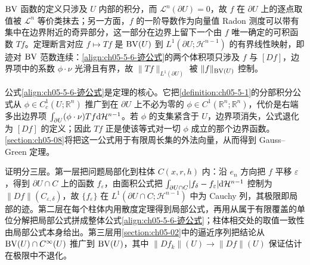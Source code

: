 \documentclass[../../main.tex]{subfiles}%
\begin{document}
\begin{remark}\label{remark:ch05-thm-5-6-动机}
$\mathrm{BV}$ 函数的定义只涉及 $U$ 内部的积分，而 $\mathcal{L}^n(\partial U)=0$，故 $f$ 在 $\partial U$ 上的逐点取值被 $\mathcal{L}^n$ 等价类抹去；另一方面，$f$ 的一阶导数作为向量值 Radon 测度可以带有集中在边界附近的奇异部分，这一部分在边界上留下一个由 $f$ 唯一确定的可积函数 $Tf$。定理断言对应 $f\mapsto Tf$ 是 $\mathrm{BV}(U)$ 到 $L^1(\partial U;\mathcal{H}^{n-1})$ 的有界线性映射，即迹对 $\mathrm{BV}$ 范数连续：\eqref{align:ch05-5-6-迹公式}的两个体积项只涉及 $f$ 与 $[Df]$，边界项中的系数 $\phi\cdot\nu$ 光滑且有界，故 $\lVert Tf\rVert_{L^1(\partial U)}$ 被 $\lVert f\rVert_{\mathrm{BV}(U)}$ 控制。

公式\eqref{align:ch05-5-6-迹公式}是定理的核心。它把\cref{definition:ch05-5-1}的分部积分公式从 $\phi\in C_c^1(U;\mathbb{R}^n)$ 推广到在 $\partial U$ 上不必为零的 $\phi\in C^1(\mathbb{R}^n;\mathbb{R}^n)$，代价是右端多出边界项 $\int_{\partial U}(\phi\cdot\nu)Tf\mathrm{d}\mathcal{H}^{n-1}$。若 $\phi$ 的支集紧含于 $U$，边界项消失，公式退化为 $[Df]$ 的定义；因此 $Tf$ 正是使该等式对一切 $\phi$ 成立的那个边界函数。\cref{section:ch05-08}将把这一公式用于有限周长集的外法向量，从而得到 Gauss--Green 定理。%

证明分三层。第一层把问题局部化到柱体 $C(x,r,h)$ 内：沿 $e_n$ 方向把 $f$ 平移 $\varepsilon$，得到 $\partial U\cap C$ 上的函数 $f_{\varepsilon}$，由面积公式把 $\int_{\partial U\cap C}\lvert f_{\delta}-f_{\varepsilon}\rvert\mathrm{d}\mathcal{H}^{n-1}$ 控制为 $\lVert Df\rVert(C_{\varepsilon,\delta})$，故 $\{f_{\varepsilon}\}$ 在 $L^1(\partial U\cap C;\mathcal{H}^{n-1})$ 中为 Cauchy 列，其极限即局部的迹。第二层在每个柱体内用散度定理得到局部公式，再用从属于有限覆盖的单位分解把局部公式拼成整体公式\eqref{align:ch05-5-6-迹公式}；柱体相交处的取值一致性由局部公式本身给出。第三层用\cref{section:ch05-02}中的逼近序列把结论从 $\mathrm{BV}(U)\cap C^{\infty}(U)$ 推广到 $\mathrm{BV}(U)$，其中 $\lVert Df_k\rVert(U)\to\lVert Df\rVert(U)$ 保证估计在极限中不退化。%
\end{remark}
\end{document}

